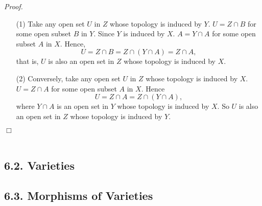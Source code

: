 \documentclass{article}
\begin{document}
\emph{Proof.}
\begin{enumerate}
\item[(1)]
  Take any open set $U$ in $Z$ whose topology is induced by $Y$.
  $U = Z \cap B$ for some open subset $B$ in $Y$.
  Since $Y$ is induced by $X$.
  $A = Y \cap A$ for some open subset $A$ in $X$.
  Hence,
  \[
    U = Z \cap B = Z \cap (Y \cap A) = Z \cap A,
  \]
  that is, $U$ is also an open set in $Z$ whose topology is induced by $X$.

\item[(2)]
  Conversely, take any open set $U$ in $Z$ whose topology is induced by $X$.
  $U = Z \cap A$ for some open subset $A$ in $X$.
  Hence
  \[
    U = Z \cap A = Z \cap (Y \cap A),
  \]
  where $Y \cap A$ is an open set in $Y$ whose topology is induced by $X$.
  So $U$ is also an open set in $Z$ whose topology is induced by $Y$.
\end{enumerate}
$\Box$ \\\\






\subsection*{6.2. Varieties \\}






\subsection*{6.3. Morphisms of Varieties \\}



\end{document}
